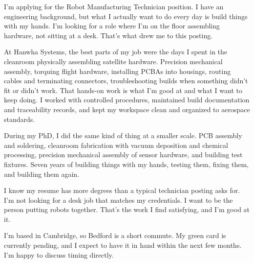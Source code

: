 \documentclass[letterpaper,11pt]{moderncv}
\date{\today}
\begin{document}
\makelettertitle

I'm applying for the Robot Manufacturing Technician position. I have an engineering background, but what I actually want to do every day is build things with my hands. I'm looking for a role where I'm on the floor assembling hardware, not sitting at a desk. That's what drew me to this posting.

At Hanwha Systems, the best parts of my job were the days I spent in the cleanroom physically assembling satellite hardware. Precision mechanical assembly, torquing flight hardware, installing PCBAs into housings, routing cables and terminating connectors, troubleshooting builds when something didn't fit or didn't work. That hands-on work is what I'm good at and what I want to keep doing. I worked with controlled procedures, maintained build documentation and traceability records, and kept my workspace clean and organized to aerospace standards.

During my PhD, I did the same kind of thing at a smaller scale. PCB assembly and soldering, cleanroom fabrication with vacuum deposition and chemical processing, precision mechanical assembly of sensor hardware, and building test fixtures. Seven years of building things with my hands, testing them, fixing them, and building them again.

I know my resume has more degrees than a typical technician posting asks for. I'm not looking for a desk job that matches my credentials. I want to be the person putting robots together. That's the work I find satisfying, and I'm good at it.

I'm based in Cambridge, so Bedford is a short commute. My green card is currently pending, and I expect to have it in hand within the next few months. I'm happy to discuss timing directly.

\makeletterclosing
\end{document}
